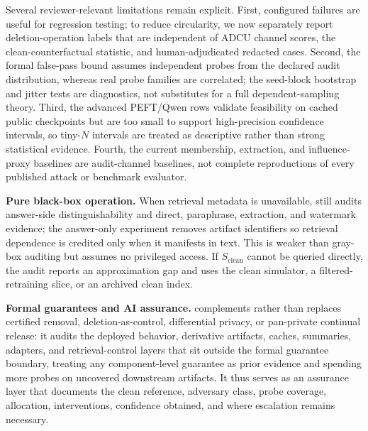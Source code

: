Several reviewer-relevant limitations remain explicit. First, configured failures are useful for regression testing; to reduce circularity, we now separately report deletion-operation labels that are independent of ADCU channel scores, the clean-counterfactual statistic, and human-adjudicated redacted cases. Second, the formal false-pass bound assumes independent probes from the declared audit distribution, whereas real probe families are correlated; the seed-block bootstrap and jitter tests are diagnostics, not substitutes for a full dependent-sampling theory. Third, the advanced PEFT/Qwen rows validate feasibility on cached public checkpoints but are too small to support high-precision confidence intervals, so tiny-$N$ intervals are treated as descriptive rather than strong statistical evidence. Fourth, the current membership, extraction, and influence-proxy baselines are audit-channel baselines, not complete reproductions of every published attack or benchmark evaluator.

\textbf{Pure black-box operation.}
When retrieval metadata is unavailable, \method{} still audits answer-side distinguishability and direct, paraphrase, extraction, and watermark evidence; the answer-only experiment removes artifact identifiers so retrieval dependence is credited only when it manifests in text. This is weaker than gray-box auditing but assumes no privileged access. If $S_{\mathrm{clean}}$ cannot be queried directly, the audit reports an approximation gap and uses the clean simulator, a filtered-retraining slice, or an archived clean index.

\textbf{Formal guarantees and AI assurance.}
\method{} complements rather than replaces certified removal, deletion-as-control, differential privacy, or pan-private continual release: it audits the deployed behavior, derivative artifacts, caches, summaries, adapters, and retrieval-control layers that sit outside the formal guarantee boundary, treating any component-level guarantee as prior evidence and spending more probes on uncovered downstream artifacts. It thus serves as an assurance layer that documents the clean reference, adversary class, probe coverage, allocation, interventions, confidence obtained, and where escalation remains necessary.
